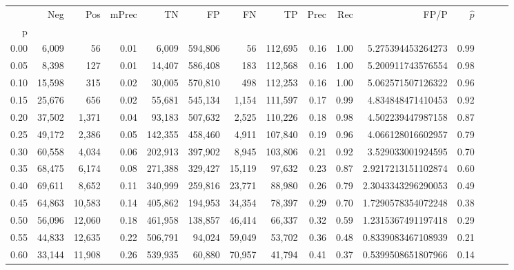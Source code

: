 \begin{tabular}{rrrrrrrrrrrrrrr}
\toprule
{} &     Neg &     Pos & mPrec &       TN &       FP &       FN &       TP &  Prec &   Rec &                  FP/P & $\hat{p}$ \\
p    &         &         &       &          &          &          &          &       &       &                       &           \\
\midrule
0.00 &   6,009 &      56 &  0.01 &    6,009 &  594,806 &       56 &  112,695 &  0.16 &  1.00 &     5.275394453264273 &      0.99 \\
0.05 &   8,398 &     127 &  0.01 &   14,407 &  586,408 &      183 &  112,568 &  0.16 &  1.00 &     5.200911743576554 &      0.98 \\
0.10 &  15,598 &     315 &  0.02 &   30,005 &  570,810 &      498 &  112,253 &  0.16 &  1.00 &     5.062571507126322 &      0.96 \\
0.15 &  25,676 &     656 &  0.02 &   55,681 &  545,134 &    1,154 &  111,597 &  0.17 &  0.99 &     4.834848471410453 &      0.92 \\
0.20 &  37,502 &   1,371 &  0.04 &   93,183 &  507,632 &    2,525 &  110,226 &  0.18 &  0.98 &     4.502239447987158 &      0.87 \\
0.25 &  49,172 &   2,386 &  0.05 &  142,355 &  458,460 &    4,911 &  107,840 &  0.19 &  0.96 &     4.066128016602957 &      0.79 \\
0.30 &  60,558 &   4,034 &  0.06 &  202,913 &  397,902 &    8,945 &  103,806 &  0.21 &  0.92 &     3.529033001924595 &      0.70 \\
0.35 &  68,475 &   6,174 &  0.08 &  271,388 &  329,427 &   15,119 &   97,632 &  0.23 &  0.87 &    2.9217213151102874 &      0.60 \\
0.40 &  69,611 &   8,652 &  0.11 &  340,999 &  259,816 &   23,771 &   88,980 &  0.26 &  0.79 &    2.3043343296290053 &      0.49 \\
0.45 &  64,863 &  10,583 &  0.14 &  405,862 &  194,953 &   34,354 &   78,397 &  0.29 &  0.70 &    1.7290578354072248 &      0.38 \\
0.50 &  56,096 &  12,060 &  0.18 &  461,958 &  138,857 &   46,414 &   66,337 &  0.32 &  0.59 &    1.2315367491197418 &      0.29 \\
0.55 &  44,833 &  12,635 &  0.22 &  506,791 &   94,024 &   59,049 &   53,702 &  0.36 &  0.48 &    0.8339083467108939 &      0.21 \\
0.60 &  33,144 &  11,908 &  0.26 &  539,935 &   60,880 &   70,957 &   41,794 &  0.41 &  0.37 &    0.5399508651807966 &      0.14 \\

\end{tabular}
